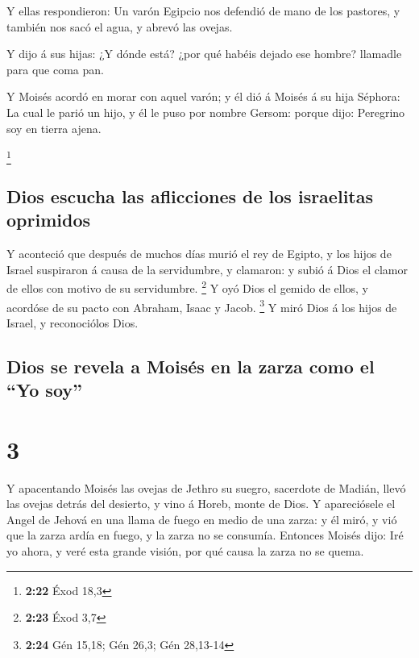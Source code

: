  Y ellas respondieron: Un varón Egipcio nos defendió de
mano de los pastores, y también nos sacó el agua, y abrevó las ovejas.

 Y dijo á sus hijas: ¿Y dónde está? ¿por qué habéis dejado
ese hombre? llamadle para que coma pan.

 Y Moisés acordó en morar con aquel varón; y él dió á
Moisés á su hija Séphora:  La cual le parió un hijo, y él
le puso por nombre Gersom: porque dijo: Peregrino soy en tierra ajena.

\footnote{\textbf{2:22} Éxod 18,3}

\hypertarget{dios-escucha-las-aflicciones-de-los-israelitas-oprimidos}{%
\subsection{Dios escucha las aflicciones de los israelitas
oprimidos}\label{dios-escucha-las-aflicciones-de-los-israelitas-oprimidos}}

 Y aconteció que después de muchos días murió el rey de
Egipto, y los hijos de Israel suspiraron á causa de la servidumbre, y
clamaron: y subió á Dios el clamor de ellos con motivo de su
servidumbre. \footnote{\textbf{2:23} Éxod 3,7}  Y oyó Dios
el gemido de ellos, y acordóse de su pacto con Abraham, Isaac y Jacob.
\footnote{\textbf{2:24} Gén 15,18; Gén 26,3; Gén 28,13-14} 
Y miró Dios á los hijos de Israel, y reconociólos Dios.

\hypertarget{dios-se-revela-a-moisuxe9s-en-la-zarza-como-el-yo-soy}{%
\subsection{Dios se revela a Moisés en la zarza como el ``Yo
soy''}\label{dios-se-revela-a-moisuxe9s-en-la-zarza-como-el-yo-soy}}

\hypertarget{section-2}{%
\section{3}\label{section-2}}

 Y apacentando Moisés las ovejas de Jethro su suegro,
sacerdote de Madián, llevó las ovejas detrás del desierto, y vino á
Horeb, monte de Dios.  Y apareciósele el Angel de Jehová en
una llama de fuego en medio de una zarza: y él miró, y vió que la zarza
ardía en fuego, y la zarza no se consumía.  Entonces Moisés
dijo: Iré yo ahora, y veré esta grande visión, por qué causa la zarza no
se quema.

